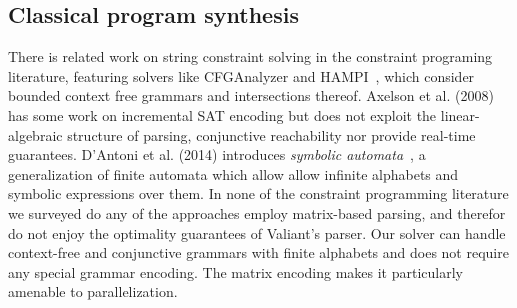 \documentclass[sigplan,review,anonymous,acmsmall]{acmart}\settopmatter{printfolios=false,printccs=false,printacmref=false}
\begin{document}

%

\subsection{Classical program synthesis}

There is related work on string constraint solving in the constraint programing literature, featuring solvers like CFGAnalyzer and HAMPI~\cite{kiezun2009hampi}, which consider bounded context free grammars and intersections thereof. Axelson et al. (2008)~\cite{axelsson2008analyzing} has some work on incremental SAT encoding but does not exploit the linear-algebraic structure of parsing, conjunctive reachability nor provide real-time guarantees. D'Antoni et al. (2014) introduces \textit{symbolic automata}~\cite{dantoni2014minimization}, a generalization of finite automata which allow allow infinite alphabets and symbolic expressions over them. In none of the constraint programming literature we surveyed do any of the approaches employ matrix-based parsing, and therefor do not enjoy the optimality guarantees of Valiant's parser. Our solver can handle context-free and conjunctive grammars with finite alphabets and does not require any special grammar encoding. The matrix encoding makes it particularly amenable to parallelization.
\end{document}
